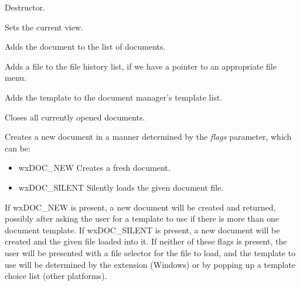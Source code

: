 
Destructor.


\label{wxdocmanageractivateview}


Sets the current view.


\label{wxdocmanageradddocument}


Adds the document to the list of documents.


\label{wxdocmanageraddfiletohistory}


Adds a file to the file history list, if we have a pointer to an appropriate file menu.


\label{wxdocmanagerassociatetemplate}


Adds the template to the document manager's template list.


\label{wxdocmanagerclosedocuments}


Closes all currently opened documents.


\label{wxdocmanagercreatedocument}


Creates a new document in a manner determined by the {\it flags} parameter, which can be:

\begin{itemize}\itemsep=0pt
\item wxDOC\_NEW Creates a fresh document.
\item wxDOC\_SILENT Silently loads the given document file.
\end{itemize}

If wxDOC\_NEW is present, a new document will be created and returned, possibly after
asking the user for a template to use if there is more than one document template.
If wxDOC\_SILENT is present, a new document will be created and the given file loaded
into it. If neither of these flags is present, the user will be presented with
a file selector for the file to load, and the template to use will be determined by the
extension (Windows) or by popping up a template choice list (other platforms).

